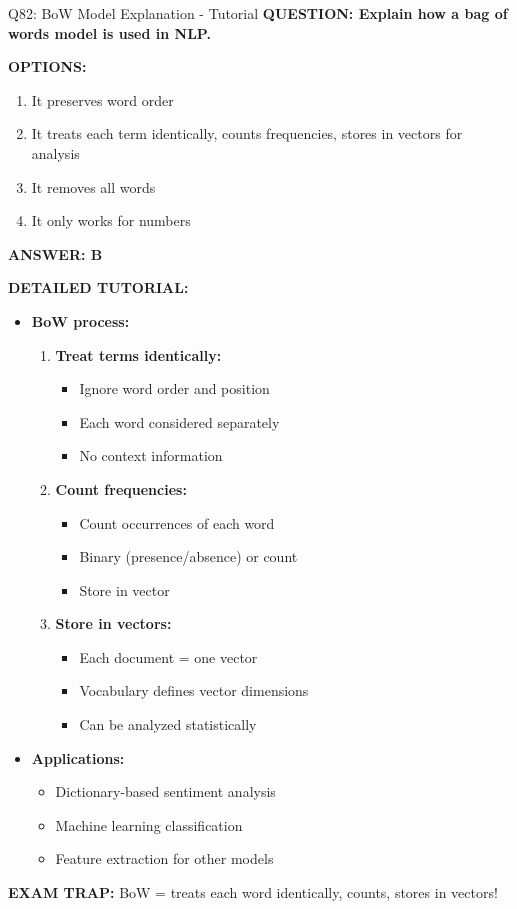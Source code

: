 \documentclass[8pt]{beamer}
\begin{document}
	\begin{frame}{Q82: BoW Model Explanation - Tutorial}
		\fontsize{6.5}{7.5}\selectfont
		\textbf{QUESTION: Explain how a bag of words model is used in NLP.}
		
		\vspace{0.1cm}
		\textbf{OPTIONS:}
		\begin{enumerate}
			\item It preserves word order
			\item It treats each term identically, counts frequencies, stores in vectors for analysis
			\item It removes all words
			\item It only works for numbers
		\end{enumerate}
		
		\vspace{0.1cm}
		\textcolor{myblue}{\textbf{ANSWER: B}}
		
		\vspace{0.1cm}
		\textbf{DETAILED TUTORIAL:}
		\begin{itemize}
			\item \textbf{BoW process:}
			\begin{enumerate}
				\item \textbf{Treat terms identically:}
				\begin{itemize}
					\item Ignore word order and position
					\item Each word considered separately
					\item No context information
				\end{itemize}
				\item \textbf{Count frequencies:}
				\begin{itemize}
					\item Count occurrences of each word
					\item Binary (presence/absence) or count
					\item Store in vector
				\end{itemize}
				\item \textbf{Store in vectors:}
				\begin{itemize}
					\item Each document = one vector
					\item Vocabulary defines vector dimensions
					\item Can be analyzed statistically
				\end{itemize}
			\end{enumerate}
			\item \textbf{Applications:}
			\begin{itemize}
				\item Dictionary-based sentiment analysis
				\item Machine learning classification
				\item Feature extraction for other models
			\end{itemize}
		\end{itemize}
		
		\textcolor{myred}{\textbf{EXAM TRAP:}} BoW = \textcolor{myblue}{treats each word identically, counts, stores in vectors}!
	\end{frame}
	
\end{document}
